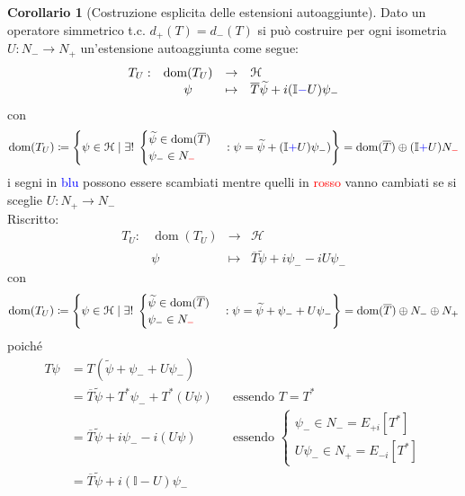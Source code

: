 \documentclass[a4paper,10pt]{article}
\theoremstyle{definition}
\DeclareMathOperator*{\dom}{dom} %
\newcommand{\hil}{\mathcal{H}} %
\theoremstyle{indentdefinition}
\theoremstyle{indenttheorem}
\newtheorem{cor}{Corollario}
\theoremstyle{myremark}
\theoremstyle{indentgeneral}
\begin{document}
\begin{cor}[Costruzione esplicita delle estensioni autoaggiunte]
    Dato un operatore simmetrico t.c. $d_+(T)=d_-(T)$ si può costruire per ogni isometria $U:N_-\to N_+$ un'estensione autoaggiunta come segue:
    $$\begin{array}{cccl}
         T_U:&\dom(T_U)&\to&\hil  \\
         & \psi &\mapsto & \overline{T}\widetilde{\psi}+i(\mathbb{I}\textcolor{blue}{-}U)\psi_-
    \end{array}$$
    con 
    $$\dom(T_U)\coloneqq\left\{\psi\in\hil\mid\exists!\;\begin{cases}
            \widetilde{\psi}\in\dom(\overline{T})\\
            \psi_-\in N_{\textcolor{red}{-}}
        \end{cases}: \psi=\widetilde{\psi}+(\mathbb{I}\textcolor{blue}{+}U)\psi_-)\right\}=\dom(\overline{T})\oplus(\mathbb{I}\textcolor{blue}{+}U)N_{\textcolor{red}{-}}$$
        i segni in \textcolor{blue}{blu} possono essere scambiati mentre quelli in \textcolor{red}{rosso} vanno cambiati se si sceglie $U:N_+\to N_-$\\
        
        
        
        Riscritto:
         $$\begin{array}{cccl}
         T_U:&\dom(T_U)&\to&\hil  \\
         & \psi &\mapsto & \overline{T}\widetilde{\psi}+i\psi_--iU\psi_-
    \end{array}$$
    con 
    $$\dom(T_U)\coloneqq\left\{\psi\in\hil\mid\exists!\;\begin{cases}
            \widetilde{\psi}\in\dom(\overline{T})\\
            \psi_-\in N_{\textcolor{red}{-}}
        \end{cases}: \psi=\widetilde{\psi}+\psi_-+U\psi_-\right\}=\dom(\overline{T})\oplus N_-\oplus N_+$$
        poiché
        \begin{align*}
            T\psi&=T(\widetilde{\psi}+\psi_-+U\psi_-)\\
            &=\overline{T}\widetilde{\psi}+T^*\psi_-+T^*(U\psi) && \text{essendo }T=T^*\\
            &=\overline{T}\widetilde{\psi}+i\psi_--i(U\psi) && \text{essendo }\begin{cases}
                \psi_-\in N_-= E_{+i}[T^*]\\ U\psi_-\in N_+=E_{-i}[T^*]
            \end{cases}\\
            &= \overline{T}\widetilde{\psi}+i(\mathbb{I}-U)\psi_-
        \end{align*}
        
\end{cor}
\end{document}
